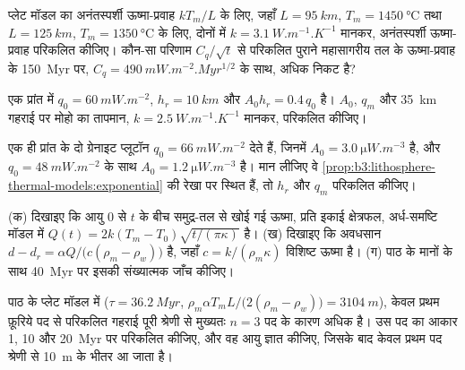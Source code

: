 \begin{exercise}[$\star\star$]\label{exo:b3:lithosphere-thermal-models:7}
प्लेट मॉडल का अनंतस्पर्शी ऊष्मा-प्रवाह $kT_m/L$ के लिए, जहाँ $L =
\qty{95}{km}$, $T_m = \qty{1450}{\celsius}$ तथा $L = \qty{125}{km}$,
$T_m = \qty{1350}{\celsius}$ के लिए, दोनों में $k = \qty{3.1}{W.m^{-1}.K^{-1}}$ मानकर, अनंतस्पर्शी ऊष्मा-प्रवाह परिकलित कीजिए।
कौन-सा परिणाम $C_q/\sqrt t$ से परिकलित पुराने महासागरीय तल के ऊष्मा-प्रवाह के
\qty{150}{Myr} पर, $C_q = \qty{490}{mW.m^{-2}.Myr^{1/2}}$ के साथ, अधिक निकट है?
\end{exercise}

\begin{exercise}[$\star\star$]\label{exo:b3:lithosphere-thermal-models:8}
एक प्रांत में $q_0 = \qty{60}{mW.m^{-2}}$, $h_r = \qty{10}{km}$ और $A_0h_r =
0.4\,q_0$ है। $A_0$, $q_m$ और \qty{35}{km} गहराई पर मोहो का तापमान,
$k = \qty{2.5}{W.m^{-1}.K^{-1}}$ मानकर, परिकलित कीजिए।
\end{exercise}

\begin{exercise}[$\star\star$]\label{exo:b3:lithosphere-thermal-models:9}
एक ही प्रांत के दो ग्रेनाइट प्लूटॉन $q_0 = \qty{66}{mW.m^{-2}}$ देते हैं, जिनमें $A_0
= \qty{3.0}{\micro W.m^{-3}}$ है, और $q_0 = \qty{48}{mW.m^{-2}}$ के साथ $A_0 =
\qty{1.2}{\micro W.m^{-3}}$ है। मान लीजिए वे
\cref{prop:b3:lithosphere-thermal-models:exponential} की रेखा पर स्थित हैं, तो $h_r$ और $q_m$ परिकलित कीजिए।
\end{exercise}

\begin{exercise}[$\star\star\star$]\label{exo:b3:lithosphere-thermal-models:10}
(क) दिखाइए कि आयु 0 से $t$ के बीच समुद्र-तल से खोई गई ऊष्मा, प्रति
इकाई क्षेत्रफल, अर्ध-समष्टि मॉडल में $Q(t) = 2k(T_m - T_0)\sqrt{t/(\pi\kappa)}$ है।
(ख) दिखाइए कि अवधसान $d - d_r = \alpha Q/\bigl(c(\rho_m -
\rho_w)\bigr)$ है, जहाँ $c = k/(\rho_m\kappa)$ विशिष्ट ऊष्मा है। (ग) पाठ के मानों के साथ
\qty{40}{Myr} पर इसकी संख्यात्मक जाँच कीजिए।
\end{exercise}

\begin{exercise}[$\star\star\star$]\label{exo:b3:lithosphere-thermal-models:11}
पाठ के प्लेट मॉडल में ($\tau = \qty{36.2}{Myr}$, $\rho_m\alpha T_mL/
\bigl(2(\rho_m - \rho_w)\bigr) = \qty{3104}{m}$), केवल प्रथम फ़ूरिये पद से परिकलित गहराई
पूरी श्रेणी से मुख्यतः $n = 3$ पद के कारण अधिक है।
उस पद का आकार 1, 10 और \qty{20}{Myr} पर परिकलित कीजिए, और वह आयु
ज्ञात कीजिए, जिसके बाद केवल प्रथम पद श्रेणी से \qty{10}{m} के भीतर आ जाता है।
\end{exercise}

